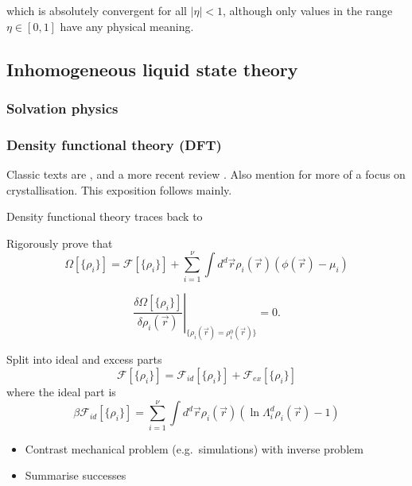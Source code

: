 which is absolutely convergent for all $|\eta| < 1$, although only values in the range $\eta \in [0,1]$ have any physical meaning.

\subsection{Inhomogeneous liquid state theory}

\subsubsection{Solvation physics}
\subsubsection{Density functional theory (DFT)}

Classic texts are \cite{Evans1979,Evans1992}, and a more recent review \cite{Roth2010}.
Also mention \cite{Lutsko2010} for more of a focus on crystallisation.
This exposition follows \cite{Roth2010} mainly.

Density functional theory traces back to 

Rigorously prove that \cite{Evans1979,Evans1992}
\begin{equation}
  \Omega[\{\rho_i\}] =
  \mathcal{F}[\{\rho_i\}]
  + \sum_{i=1}^\nu \int d^d \vec{r} \rho_i(\vec{r}) (\phi(\vec{r}) - \mu_i)
\end{equation}

\begin{equation}
  \left.
  \frac{\delta \Omega[\{\rho_i\}]}{\delta \rho_i(\vec{r})}
  \right|_{\{\rho_i(\vec{r}) = \rho_i^0(\vec{r})\}}
  = 0.
\end{equation}

Split into ideal and excess parts
\begin{equation}
  \mathcal{F}[\{\rho_i\}] =
  \mathcal{F}_{id}[\{\rho_i\}] + \mathcal{F}_{ex}[\{\rho_i\}]
\end{equation}
where the ideal part is
\begin{equation}
  \beta \mathcal{F}_{id}[\{\rho_i\}] =
  \sum_{i=1}^\nu \int d^d \vec{r} \rho_i(\vec{r})
  (\ln{\Lambda_i^d \rho_i(\vec{r})} - 1)
\end{equation}

\begin{itemize}
\item Contrast mechanical problem (e.g.\ simulations) with inverse problem
\item Summarise successes
\end{itemize}

